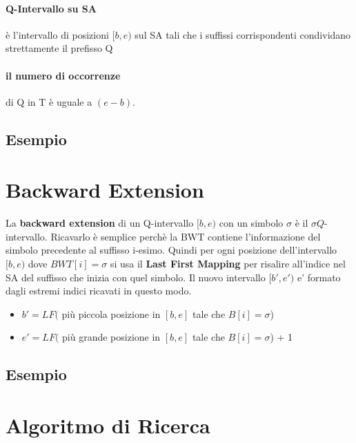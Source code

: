 \paragraph{Q-Intervallo su SA} \`e l'intervallo di posizioni $[b,e)$ sul SA tali che i suffissi corrispondenti condividano strettamente il prefisso Q
\paragraph{il numero di occorrenze} di Q in T \`e uguale a $(e-b)$.

\subsection{Esempio}


\section{Backward Extension}

La \textbf{backward extension} di un Q-intervallo $[b, e)$ con un simbolo $\sigma$ \`e il $\sigma Q$-intervallo. Ricavarlo \`e semplice perch\`e la BWT contiene l'informazione del simbolo precedente al suffisso i-esimo. Quindi per ogni posizione dell'intervallo $[b,e)$ dove $BWT[i] = \sigma$ si usa il \textbf{Last First Mapping} per risalire all'indice nel SA del suffisso che inizia con quel simbolo. Il nuovo intervallo $[b',e')$ e' formato dagli estremi indici ricavati in questo modo.

\begin{itemize}
    \item $b' = LF($ pi\`u piccola posizione in $[b, e]$ tale che $B[i] = \sigma$)
    \item $e' = LF($ pi\`u grande posizione in $[b, e]$ tale che $B[i] = \sigma$) + 1
\end{itemize}

\subsection{Esempio}


\section{Algoritmo di Ricerca}

